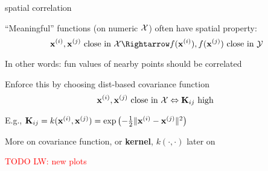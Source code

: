 \documentclass[11pt,compress,t,notes=noshow, xcolor=table]{beamer}
\begin{document}

\begin{framei}{spatial correlation}
\item ``Meaningful'' functions (on numeric $\Xspace$) often have spatial property:
$$\xi, \xi[j] \text{ close in } \Xspace \Rightarrow f(\xi), f(\xi[j]) \text{ close in } \Yspace$$
\item In other words: fun values of nearby points should be correlated
\item Enforce this by choosing dist-based covariance function
$$ \xi[i], \xi[j] \text{ close in } \Xspace \Leftrightarrow \Kmat_{ij} \text{ high }$$
\item E.g., $\Kmat_{ij} = k(\xi, \xi[j]) = \exp \left(- \tfrac{1}{2} \| \xi - \xi[j] \|^2 \right)$
\vfill
{}
\item More on covariance function, or \textbf{kernel}, $k(\cdot, \cdot)$ later on

\textcolor{red}{TODO LW: new plots}
\end{framei} 

\end{document}

